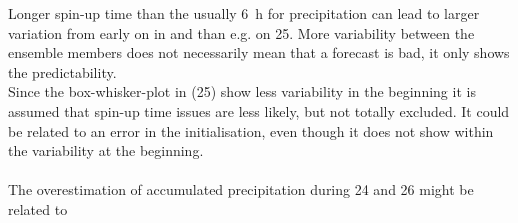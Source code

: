 Longer spin-up time than the usually \SI{6}{\hour} for precipitation can lead to larger variation from early on in  and  
than e.g. on \SI{25}{\dec}.
More variability between the ensemble members does not necessarily mean that a forecast is bad, it only shows the predictability. %
\\
Since the box-whisker-plot in  (\SI{25}{\dec}) show less variability in the beginning it is assumed that spin-up time issues are less likely, but not totally excluded. It could be related to an error in the initialisation, even though it does not show within the variability at the beginning.
\\
\\
The overestimation of accumulated precipitation during \num{24} and \SI{26}{\dec} might be related to
